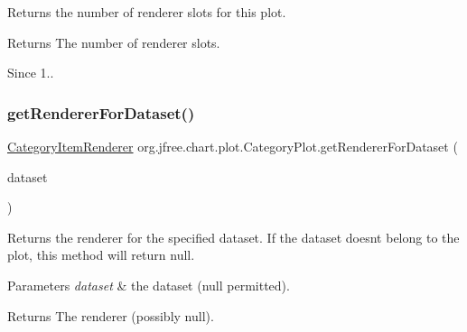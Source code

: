 Returns the number of renderer slots for this plot.

\begin{DoxyReturn}{Returns}
The number of renderer slots.
\end{DoxyReturn}
\begin{DoxySince}{Since}
1.. 
\end{DoxySince}
\mbox{\label{classorg_1_1jfree_1_1chart_1_1plot_1_1_category_plot_a78f3b5a1b0d09cabbf4369a38ba04991}} 
\subsubsection{\texorpdfstring{get\+Renderer\+For\+Dataset()}{getRendererForDataset()}}
{\footnotesize\ttfamily \mbox{\hyperlink{interfaceorg_1_1jfree_1_1chart_1_1renderer_1_1category_1_1_category_item_renderer}{Category\+Item\+Renderer}} org.\+jfree.\+chart.\+plot.\+Category\+Plot.\+get\+Renderer\+For\+Dataset (\begin{DoxyParamCaption}\item[{\mbox{\hyperlink{interfaceorg_1_1jfree_1_1data_1_1category_1_1_category_dataset}{Category\+Dataset}}}]{dataset }\end{DoxyParamCaption})}

Returns the renderer for the specified dataset. If the dataset doesn\textquotesingle{}t belong to the plot, this method will return {\ttfamily null}.


\begin{DoxyParams}{Parameters}
{\em dataset} & the dataset ({\ttfamily null} permitted).\\
\hline
\end{DoxyParams}
\begin{DoxyReturn}{Returns}
The renderer (possibly {\ttfamily null}). 
\end{DoxyReturn}
\mbox{\label{classorg_1_1jfree_1_1chart_1_1plot_1_1_category_plot_a64430e6feca3cbcf5ef475e3c34b488e}} 
